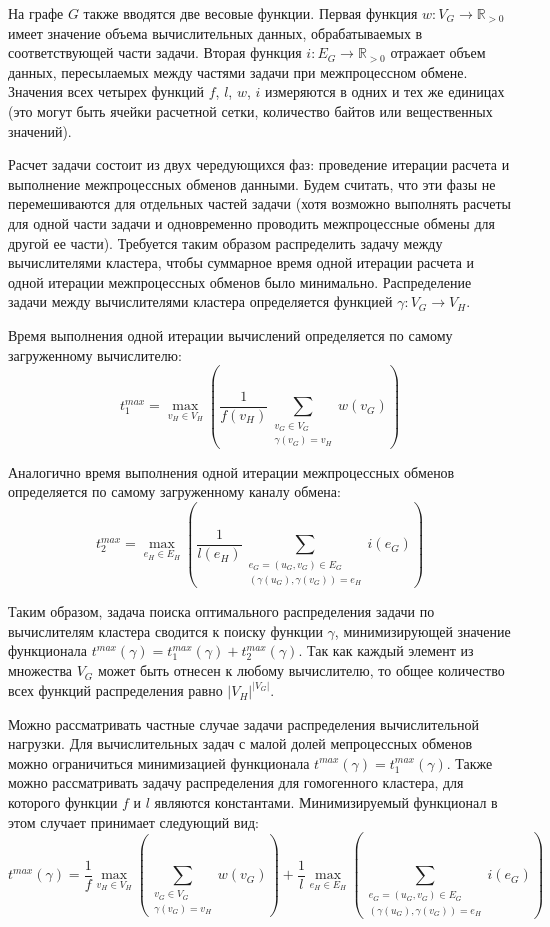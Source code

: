 На графе $G$ также вводятся две весовые функции.
Первая функция $w: V_G \rightarrow \mathbb{R}_{> 0}$ имеет значение объема вычислительных данных, обрабатываемых в соответствующей части задачи.
Вторая функция $i: E_G \rightarrow \mathbb{R}_{> 0}$ отражает объем данных, пересылаемых между частями задачи при межпроцессном обмене.
Значения всех четырех функций $f$, $l$, $w$, $i$ измеряются в одних и тех же единицах (это могут быть ячейки расчетной сетки, количество байтов или вещественных значений).

Расчет задачи состоит из двух чередующихся фаз: проведение итерации расчета и выполнение межпроцессных обменов данными.
Будем считать, что эти фазы не перемешиваются для отдельных частей задачи (хотя возможно выполнять расчеты для одной части задачи и одновременно проводить межпроцессные обмены для другой ее части).
Требуется таким образом распределить задачу между вычислителями кластера, чтобы суммарное время одной итерации расчета и одной итерации межпроцессных обменов было минимально.
Распределение задачи между вычислителями кластера определяется функцией $\gamma: V_G \rightarrow V_H$.

Время выполнения одной итерации вычислений определяется по самому загруженному вычислителю:
\begin{equation}
	t_1^{max} = \max_{v_H \in V_H}{\left( \frac{1}{f(v_H)} \sum_{\substack{v_G \in V_G \\ \gamma(v_G) = v_H}}{w(v_G)} \right)}
\end{equation}

Аналогично время выполнения одной итерации межпроцессных обменов определяется по самому загруженному каналу обмена:
\begin{equation}
	t_2^{max} = \max_{e_H \in E_H}{\left( \frac{1}{l(e_H)} \sum_{\substack{e_G = (u_G, v_G) \in E_G \\ (\gamma(u_G), \gamma(v_G)) = e_H}}{i(e_G)} \right)}
\end{equation}

Таким образом, задача поиска оптимального распределения задачи по вычислителям кластера сводится к поиску функции $\gamma$, минимизирующей значение функционала $t^{max}(\gamma) = t_1^{max}(\gamma) + t_2^{max}(\gamma)$.
Так как каждый элемент из множества $V_G$ может быть отнесен к любому вычислителю, то общее количество всех функций распределения равно $|V_H|^{|V_G|}$.

Можно рассматривать частные случае задачи распределения вычислительной нагрузки.
Для вычислительных задач с малой долей мепроцессных обменов можно ограничиться минимизацией функционала $t^{max}(\gamma) = t_1^{max}(\gamma)$.
Также можно рассматривать задачу распределения для гомогенного кластера, для которого функции $f$ и $l$ являются константами. Минимизируемый функционал в этом случает принимает следующий вид:
\begin{equation}
	t^{max}(\gamma) =
		\frac{1}{f} \max_{v_H \in V_H}{\left( \sum_{\substack{v_G \in V_G \\ \gamma(v_G) = v_H}}{w(v_G)} \right)} + 
		\frac{1}{l} \max_{e_H \in E_H}{\left( \sum_{\substack{e_G = (u_G, v_G) \in E_G \\ (\gamma(u_G), \gamma(v_G)) = e_H}}{i(e_G)} \right)}
\end{equation}

